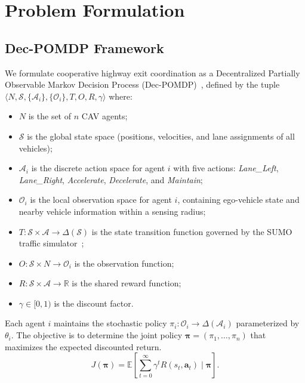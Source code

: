 \documentclass[journal]{IEEEtran}
\newcommand{\E}{\mathbb{E}}
\newcommand{\R}{\mathbb{R}}
\newcommand{\cA}{\mathcal{A}}
\newcommand{\cS}{\mathcal{S}}
\newcommand{\cO}{\mathcal{O}}
\begin{document}
\section{Problem Formulation}
\label{sec:formulation}

\subsection{Dec-POMDP Framework}

We formulate cooperative highway exit coordination as a Decentralized Partially Observable Markov Decision Process (Dec-POMDP)~\cite{oliehoek2016concise}, defined by the tuple $\langle N, \cS, \{\cA_i\}, \{\cO_i\}, T, O, R, \gamma \rangle$ where:

\begin{itemize}
    \item $N$ is the set of $n$ CAV agents;
    \item $\cS$ is the global state space (positions, velocities, and lane assignments of all vehicles);
    \item $\cA_i$ is the discrete action space for agent $i$ with five actions: \emph{Lane\_Left}, \emph{Lane\_Right}, \emph{Accelerate}, \emph{Decelerate}, and \emph{Maintain};
    \item $\cO_i$ is the local observation space for agent $i$, containing ego-vehicle state and nearby vehicle information within a sensing radius;
    \item $T: \cS \times \cA \rightarrow \Delta(\cS)$ is the state transition function governed by the SUMO traffic simulator~\cite{lopez2018microscopic};
    \item $O: \cS \times N \rightarrow \cO_i$ is the observation function;
    \item $R: \cS \times \cA \rightarrow \R$ is the shared reward function;
    \item $\gamma \in [0,1)$ is the discount factor.
\end{itemize}

Each agent $i$ maintains the stochastic policy $\pi_i: \cO_i \rightarrow \Delta(\cA_i)$ parameterized by $\theta_i$.
The objective is to determine the joint policy $\bm{\pi} = (\pi_1, \ldots, \pi_n)$ that maximizes the expected discounted return.
\begin{equation}
    J(\bm{\pi}) = \E\left[\sum_{t=0}^{\infty} \gamma^t R(s_t, \bm{a}_t) \mid \bm{\pi}\right].
\end{equation}
\end{document}
